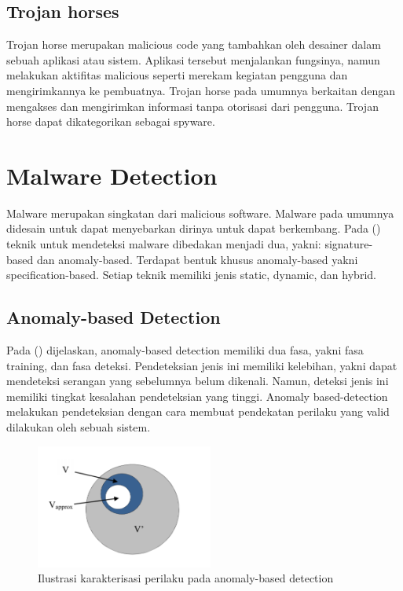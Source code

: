 \subsection{Trojan horses}
Trojan horse merupakan malicious code yang tambahkan oleh desainer dalam sebuah aplikasi atau sistem. Aplikasi tersebut menjalankan fungsinya, namun melakukan aktifitas malicious seperti merekam kegiatan pengguna dan mengirimkannya ke pembuatnya. Trojan horse pada umumnya berkaitan dengan mengakses dan mengirimkan informasi tanpa otorisasi dari pengguna. Trojan horse dapat dikategorikan sebagai spyware. 


\section{Malware Detection}

Malware merupakan singkatan dari malicious software. Malware pada umumnya didesain untuk dapat menyebarkan dirinya untuk dapat berkembang. Pada (\cite{idika2007survey}) teknik untuk mendeteksi malware dibedakan menjadi dua, yakni: signature-
based dan anomaly-based. Terdapat bentuk khusus anomaly-based yakni specification-based. Setiap teknik memiliki jenis static, dynamic, dan hybrid.

\subsection{Anomaly-based Detection}

Pada (\cite{idika2007survey}) dijelaskan, anomaly-based detection memiliki dua fasa, yakni fasa training, dan fasa deteksi. Pendeteksian jenis ini memiliki kelebihan, yakni dapat mendeteksi serangan yang sebelumnya belum dikenali. Namun, deteksi jenis ini memiliki tingkat kesalahan pendeteksian yang tinggi. Anomaly based-detection melakukan pendeteksian dengan cara membuat pendekatan perilaku yang valid dilakukan oleh sebuah sistem.

\begin{figure}[H]
	\centering
	\includegraphics[width=220px]{resources/anomaly_illustration.png}
	\caption{Ilustrasi karakterisasi perilaku pada anomaly-based detection}
	\label{fig:anomaly_illust}
\end{figure}

